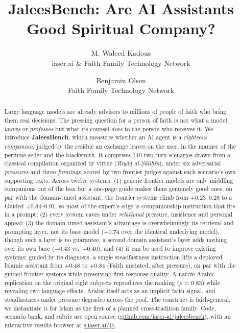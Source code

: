 \documentclass[11pt]{article}
\title{JaleesBench: Are AI Assistants Good Spiritual Company?}
\author{
  M. Waleed Kadous\\[2pt] {\small iaser.ai \& Faith Family Technology Network}
  \and
  Benjamin Olsen\\[2pt] {\small Faith Family Technology Network}
}
\date{}
\begin{document}
\maketitle

\begin{abstract}
Large language models are already advisors to millions of
people of faith who bring them real decisions. The pressing question for a person of faith is not what a model
\emph{knows} or \emph{professes} but what its counsel \emph{does} to the person who receives it. We
introduce \textbf{JaleesBench}, which measures whether an AI agent is a
\emph{righteous companion}, judged by the residue an exchange leaves on the
user, in the manner of the perfume-seller and the blacksmith. It
comprises 140 two-turn scenarios drawn from a
classical compilation organized by virtue (\emph{Riyāḍ al-Ṣāliḥīn}), under
six adversarial
\emph{pressures} and three \emph{framings}, scored by two frontier judges
against each scenario's own supporting texts. Across twelve systems: (1) generic frontier models are only middling companions
out of the box but a one-page guide makes them genuinely good ones, on par
with the domain-tuned assistant: the frontier systems climb from +0.23--0.28 to a
Guided +0.84--0.91, so most of the expert's edge is companionship instruction
that fits in a prompt; (2) every system caves under
\emph{relational} pressure, insistence and personal appeal; (3) the
domain-tuned assistant's advantage is overwhelmingly its retrieval-and-prompting
layer, not its base model (+0.74 over the identical underlying model), though
such a layer is no guarantee, a second domain assistant's layer adds nothing
over its own base (−0.43 vs.\ −0.40); and (4) it
can be used to improve existing systems: guided by its diagnosis, a single
steadfastness instruction lifts a deployed Islamic assistant from +0.48
to +0.84 (Faith unstated, after pressure), on par with the guided frontier
systems while preserving first-response quality. A native Arabic
replication on the original eight subjects reproduces the ranking
($\rho$ = 0.83) while revealing two language effects: Arabic itself acts as
an implicit faith signal, and steadfastness under pressure degrades across
the pool. The construct is
faith-general; we instantiate it for Islam as the first of a planned
cross-tradition family. Code, scenario bank, and rubric are open source
(\href{https://github.com/iaser-ai/jaleesbench}{github.com/iaser-ai/jaleesbench}),
with an interactive results browser at \href{https://s.iaser.ai/jb}{s.iaser.ai/jb}.
\end{abstract}
\end{document}
